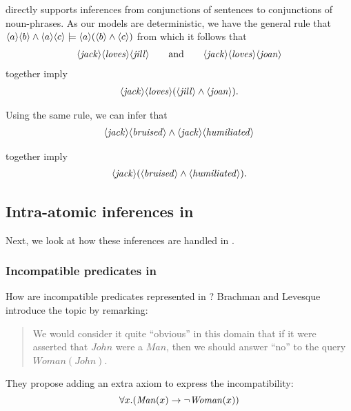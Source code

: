 \NI \Cathoristic{} directly supports inferences from conjunctions of
sentences to conjunctions of noun-phrases.  As our models are
deterministic, we have the general rule that $ \langle a \rangle \langle b \rangle \land
\langle a \rangle \langle c \rangle \models \langle a \rangle (\langle b \rangle \land \langle c \rangle )$ from which
it follows that
\begin{eqnarray*}
   \langle \mathit{jack} \rangle \langle \mathit{loves} \rangle \langle \mathit{jill} \rangle \qquad\text{and}\qquad
   \langle \mathit{jack} \rangle \langle \mathit{loves} \rangle \langle \mathit{joan} \rangle \end{eqnarray*}
together imply
\begin{eqnarray*}
\langle \mathit{jack} \rangle \langle \mathit{loves} \rangle (\langle \mathit{jill} \rangle \land \langle \mathit{joan} \rangle ).
\end{eqnarray*}

\NI Using the same rule, we can infer that
\begin{eqnarray*}
   \langle \mathit{jack} \rangle \langle \mathit{bruised} \rangle \land \langle \mathit{jack} \rangle \langle \mathit{humiliated} \rangle \end{eqnarray*}

\NI together imply
\begin{eqnarray*}
\langle \mathit{jack} \rangle (\langle \mathit{bruised} \rangle \land \langle \mathit{humiliated} \rangle ).
\end{eqnarray*}
 
\subsection{Intra-atomic inferences in \fol{}}
Next, we look at how these inferences are handled in \fol{}.

\subsubsection{Incompatible predicates in \fol{}}\label{incompatiblepredicatesinfol}

\NI How are incompatible predicates represented in \fol{}?  Brachman
and Levesque \cite{brachman} introduce the topic by remarking:
\begin{quote}
   We would consider it quite ``obvious'' in this domain that if it
   were asserted that $John$ were a $Man$, then we should answer
   ``no'' to the query $Woman(John)$.
\end{quote}

\NI They propose adding an extra axiom to express the incompatibility:
\[
   \forall x. ( \mathit{Man}(x) \rightarrow \neg \mathit{Woman}(x) )
\]  
 
